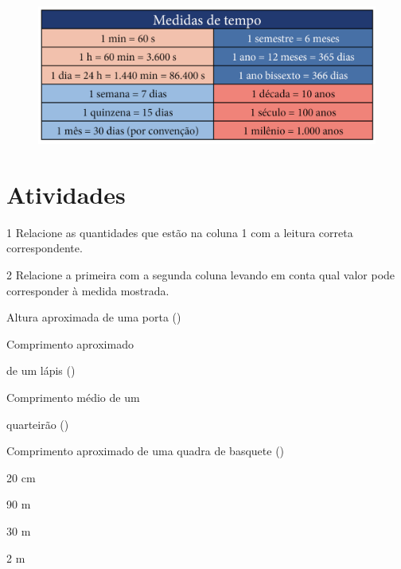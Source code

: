 \begin{figure}[htpb!]
\includegraphics[width=\textwidth]{../ilustracoes/MAT5/SAEB_5ANO_MAT_figura30_2.png}
\end{figure}

\section{Atividades}

\num{1} Relacione as quantidades que estão na coluna 1 com a leitura correta correspondente.

\begin{multicols}{2}







\end{multicols}



\num{2} Relacione a primeira com a segunda coluna levando em conta qual
valor pode corresponder à medida mostrada.

\begin{multicols}{2}

\noindent{}Altura aproximada de uma porta ({})

\noindent{}Comprimento aproximado

\noindent{}de um lápis ({\rosa{20 cm}})

\noindent{}Comprimento médio de um

\noindent{} quarteirão ({})

\noindent{}Comprimento aproximado de uma quadra de basquete ({})

\columnbreak

20 cm
 
90 m

30 m
 
2 m
\end{multicols}

